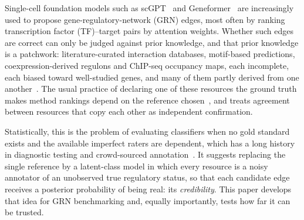 \documentclass[11pt,a4paper]{article}
\begin{document}
Single-cell foundation models such as scGPT~\citep{cui2024scgpt} and Geneformer~\citep{theodoris2023transfer} are increasingly used to propose gene-regulatory-network (GRN) edges, most often by ranking transcription factor (TF)--target pairs by attention weights.
Whether such edges are correct can only be judged against prior knowledge, and that prior knowledge is a patchwork: literature-curated interaction databases, motif-based predictions, coexpression-derived regulons and ChIP-seq occupancy maps, each incomplete, each biased toward well-studied genes, and many of them partly derived from one another~\citep{garcia2019benchmark,mullerdott2023collectri}.
The usual practice of declaring one of these resources the ground truth makes method rankings depend on the reference chosen~\citep{pratapa2020benchmarking}, and treats agreement between resources that copy each other as independent confirmation.

Statistically, this is the problem of evaluating classifiers when no gold standard exists and the available imperfect raters are dependent, which has a long history in diagnostic testing and crowd-sourced annotation~\citep{dawid1979maximum,hui1980estimating,dendukuri2001bayesian,albert2004cautionary}.
It suggests replacing the single reference by a latent-class model in which every resource is a noisy annotator of an unobserved true regulatory status, so that each candidate edge receives a posterior probability of being real: its \emph{credibility}.
This paper develops that idea for GRN benchmarking and, equally importantly, tests how far it can be trusted.
\end{document}
